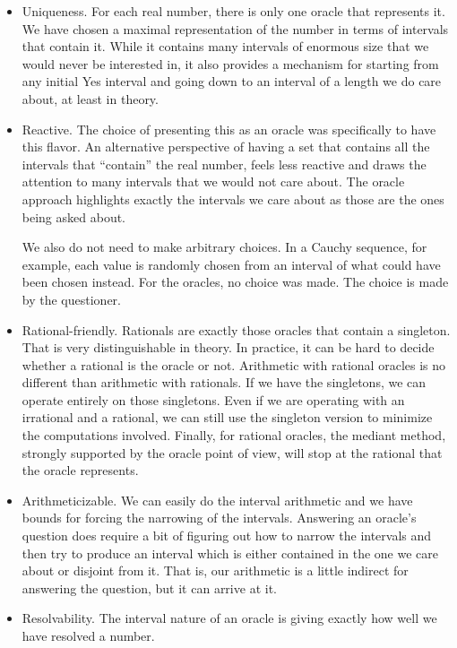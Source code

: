 \documentclass[12pt]{article}
\theoremstyle{remark}
\begin{document}
\begin{itemize}
    \item Uniqueness. For each real number, there is only one oracle that represents it. We have chosen a maximal representation of the number in terms of intervals that contain it. While it contains many intervals of enormous size that we would never be interested in, it also provides a mechanism for starting from any initial Yes interval and going down to an interval of a length we do care about, at least in theory. 
    \item Reactive. The choice of presenting this as an oracle was specifically to have this flavor. An alternative perspective of having a set that contains all the intervals that ``contain'' the real number, feels less reactive and draws the attention to many intervals that we would not care about. The oracle approach highlights exactly the intervals we care about as those are the ones being asked about. 
    
    We also do not need to make arbitrary choices. In a Cauchy sequence, for example, each value is randomly chosen from an interval of what could have been chosen instead. For the oracles, no choice was made. The choice is made by the questioner. 
    \item Rational-friendly. Rationals are exactly those oracles that contain a singleton. That is very distinguishable in theory. In practice, it can be hard to decide whether a rational is the oracle or not. Arithmetic with rational oracles is no different than arithmetic with rationals. If we have the singletons, we can operate entirely on those singletons. Even if we are operating with an irrational and a rational, we can still use the singleton version to minimize the computations involved. Finally, for rational oracles, the mediant method, strongly supported by the oracle point of view, will stop at the rational that the oracle represents.
    \item Arithmeticizable. We can easily do the interval arithmetic and we have bounds for forcing the narrowing of the intervals. Answering an oracle's question does require a bit of figuring out how to narrow the intervals and then try to produce an interval which is either contained in the one we care about or disjoint from it. That is, our arithmetic is a little indirect for answering the question, but it can arrive at it.
    \item Resolvability. The interval nature of an oracle is giving exactly how well we have resolved a number. 
\end{itemize}
\end{document}
